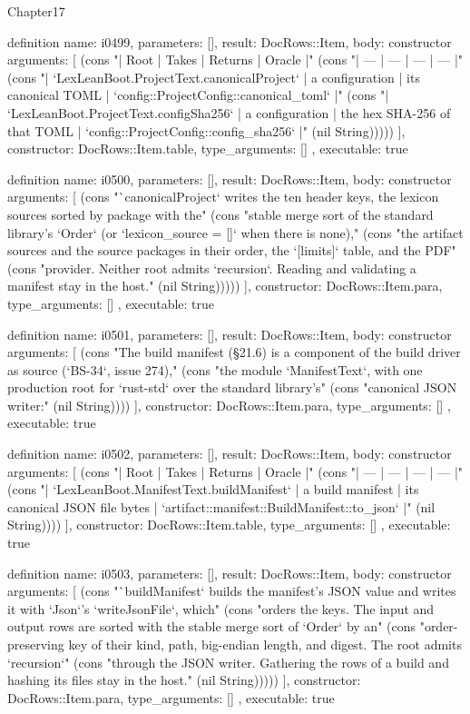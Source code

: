 \begin{lexlean}{Chapter17}
\begin{semanticmodule}
definition{
  name: i0499,
  parameters: [],
  result: DocRows::Item,
  body: constructor{
    arguments: [
      (cons "| Root | Takes | Returns | Oracle |" (cons "| --- | --- | --- | --- |" (cons "| `LexLeanBoot.ProjectText.canonicalProject` | a configuration | its canonical TOML | `config::ProjectConfig::canonical_toml` |" (cons "| `LexLeanBoot.ProjectText.configSha256` | a configuration | the hex SHA-256 of that TOML | `config::ProjectConfig::config_sha256` |" (nil String)))))
    ],
    constructor: DocRows::Item.table,
    type_arguments: []
  },
  executable: true
}

definition{
  name: i0500,
  parameters: [],
  result: DocRows::Item,
  body: constructor{
    arguments: [
      (cons "`canonicalProject` writes the ten header keys, the lexicon sources sorted by package with the" (cons "stable merge sort of the standard library's `Order` (or `lexicon_source = []` when there is none)," (cons "the artifact sources and the source packages in their order, the `[limits]` table, and the PDF" (cons "provider. Neither root admits `recursion`. Reading and validating a manifest stay in the host." (nil String)))))
    ],
    constructor: DocRows::Item.para,
    type_arguments: []
  },
  executable: true
}

definition{
  name: i0501,
  parameters: [],
  result: DocRows::Item,
  body: constructor{
    arguments: [
      (cons "The build manifest (§21.6) is a component of the build driver as source (`BS-34`, issue 274)," (cons "the module `ManifestText`, with one production root for `rust-std` over the standard library's" (cons "canonical JSON writer:" (nil String))))
    ],
    constructor: DocRows::Item.para,
    type_arguments: []
  },
  executable: true
}

definition{
  name: i0502,
  parameters: [],
  result: DocRows::Item,
  body: constructor{
    arguments: [
      (cons "| Root | Takes | Returns | Oracle |" (cons "| --- | --- | --- | --- |" (cons "| `LexLeanBoot.ManifestText.buildManifest` | a build manifest | its canonical JSON file bytes | `artifact::manifest::BuildManifest::to_json` |" (nil String))))
    ],
    constructor: DocRows::Item.table,
    type_arguments: []
  },
  executable: true
}

definition{
  name: i0503,
  parameters: [],
  result: DocRows::Item,
  body: constructor{
    arguments: [
      (cons "`buildManifest` builds the manifest's JSON value and writes it with `Json`'s `writeJsonFile`, which" (cons "orders the keys. The input and output rows are sorted with the stable merge sort of `Order` by an" (cons "order-preserving key of their kind, path, big-endian length, and digest. The root admits `recursion`" (cons "through the JSON writer. Gathering the rows of a build and hashing its files stay in the host." (nil String)))))
    ],
    constructor: DocRows::Item.para,
    type_arguments: []
  },
  executable: true
}


\end{semanticmodule}
\end{lexlean}

